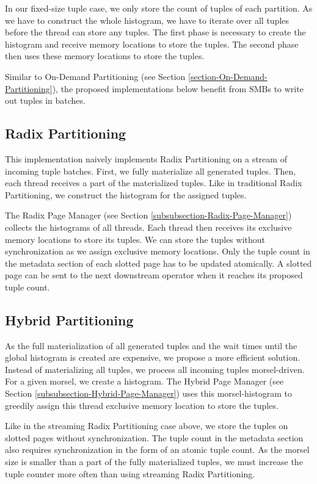 In our fixed-size tuple case, we only store the count of tuples of each partition.
As we have to construct the whole histogram, we have to iterate over all tuples before the thread can store any tuples.
The first phase is necessary to create the histogram and receive memory locations to store the tuples.
The second phase then uses these memory locations to store the tuples.

Similar to On-Demand Partitioning (see Section \ref{section-On-Demand-Partitioning}), the proposed implementations below benefit from \acfp{SMB} to write out tuples in batches.
\subsection{Radix Partitioning}
This implementation naively implements Radix Partitioning on a stream of incoming tuple batches.
First, we fully materialize all generated tuples.
Then, each thread receives a part of the materialized tuples.
Like in traditional Radix Partitioning, we construct the histogram for the assigned tuples.

The Radix Page Manager (see Section \ref{subsubsection-Radix-Page-Manager}) collects the histograms of all threads.
Each thread then receives its exclusive memory locations to store its tuples.
We can store the tuples without synchronization as we assign exclusive memory locations.
Only the tuple count in the metadata section of each slotted page has to be updated atomically.
A slotted page can be sent to the next downstream operator when it reaches its proposed tuple count.

\subsection{Hybrid Partitioning}
As the full materialization of all generated tuples and the wait times until the global histogram is created are expensive, we propose a more efficient solution.
Instead of materializing all tuples, we process all incoming tuples morsel-driven.
For a given morsel, we create a histogram.
The Hybrid Page Manager (see Section \ref{subsubsection-Hybrid-Page-Manager}) uses this morsel-histogram to greedily assign this thread exclusive memory location to store the tuples.

Like in the streaming Radix Partitioning case above, we store the tuples on slotted pages without synchronization.
The tuple count in the metadata section also requires synchronization in the form of an atomic tuple count.
As the morsel size is smaller than a part of the fully materialized tuples, we must increase the tuple counter more often than using streaming Radix Partitioning.

